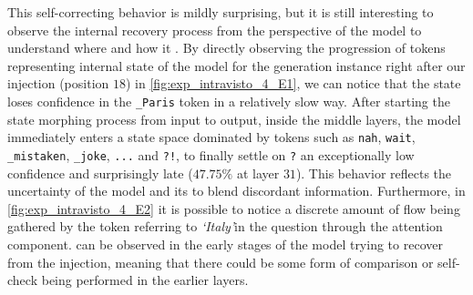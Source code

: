This self-correcting behavior is mildly surprising, but it is still interesting to observe the internal recovery process from the perspective of the model to understand where and how it .
By directly observing the progression of tokens representing internal state of the model for the generation instance right after our injection (position $18$) in \cref{fig:exp_intravisto_4_E1}, we can notice that the state loses confidence in the \texttt{\_Paris} token in a relatively slow way.
After starting the state morphing process from input to output, inside the middle layers, the model immediately enters a state space dominated by tokens such as \texttt{nah}, \texttt{wait}, \texttt{\_mistaken}, \texttt{\_joke}, \texttt{...} and \texttt{?!}, to finally settle on \texttt{?}  an exceptionally low confidence and surprisingly late ($47.75\%$ at layer $31$).
This behavior reflects the uncertainty of the model and its  to blend discordant information.
Furthermore, in \cref{fig:exp_intravisto_4_E2} it is possible to notice a discrete amount of flow being gathered by the token referring to \emph{`Italy'}in the question through the attention component.
 can be observed in the early stages of the model trying to recover from the injection, meaning that there could be some form of comparison or self-check being performed in the earlier layers.

\begin{figure}[t!]
    \centering
    \caption{}
    \label{fig:exp_intravisto_4_E}
\end{figure}

